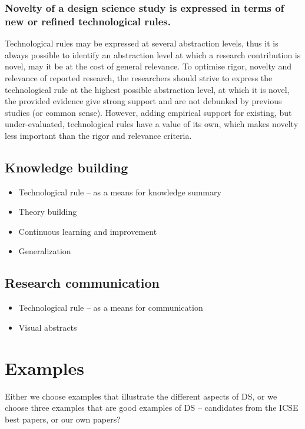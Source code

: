 \documentclass[graybox]{svmult}
\begin{document}
\subsubsection{Novelty of a design science study is expressed in terms of new or refined technological rules.} Technological rules may be expressed at several abstraction levels, thus it is always possible to identify an abstraction level at which a research contribution is novel, may it be at the cost of general relevance. To optimise rigor, novelty and relevance of reported research, the researchers should strive to express the technological rule at the highest possible abstraction level, at which it is novel, the provided evidence give strong support and are not debunked by previous studies (or common sense). However, adding empirical support for existing, but under-evaluated, technological rules have a value of its own, which makes novelty less important than the rigor and relevance criteria.


\subsection{Knowledge building}
\label{sec:knowledge}

\begin{itemize}
\item Technological rule -- as a means for knowledge summary
\item Theory building
\item Continuous learning and improvement
\item Generalization
\end{itemize}

\subsection{Research communication}
\label{sec:communication}

\begin{itemize}
\item Technological rule -- as a means for communication
\item Visual abstracts
\end{itemize}

\cite{CarverIEEESW2018}

\section{Examples}
Either we choose examples that illustrate the different aspects of DS, or we choose three examples that are good examples of DS -- candidates from the ICSE best papers, or our own papers?
\end{document}
